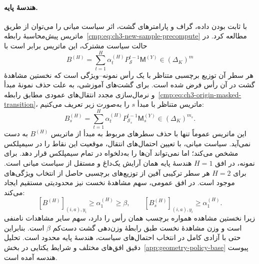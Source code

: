 \paragraph{هندسهٔ پایه.}
با ثابت بودن داده، گراف و پارامترهای گشت، اثر سیاست میانی را می‌توان از طریق ماتریس پیش‌محاسبهٔ رابطه~\eqref{cmp:eq:ch3-new-sample-precompute} مطالعه کرد. در حالت سیاست مشترک، این ماتریس برابر است با
\begin{equation}\label{cmp:eq:ch3-geometry-base-B}
B^{(H)}=\sum_{t=1}^{H}\alpha_t^{(H)}P_{\mathcal S}^{t-1}\mathsf M^{(Y)}\in(\Delta_K)^m
\end{equation}
هر سطر آن توزیع برچسبی متناظر با یک رأس نمونه--ویژگی است که نخستین مشاهدهٔ گشت در آن رأس فرض شده است. برای گشت‌های آموزشی، به علت حذف نمونهٔ مبدأ و نرمال‌سازی مجدد انتقال‌های عمودی مطابق رابطه~\eqref{cmp:eq:ch3-origin-masked-transition}، ماتریس متناظر با مبدأ $s$ را به‌صورت زیر تعریف می‌کنیم:
\begin{equation}\label{cmp:eq:ch3-geometry-origin-B}
B_s^{(H)}=\sum_{t=1}^{H}\alpha_t^{(H)}P_{\mathcal S_s}^{t-1}\mathsf M_s^{(Y)}\in(\Delta_K)^{m_s}.
\end{equation}
این ماتریس عموماً تنها با حذف سطرهای مربوط به مبدأ از ماتریس $B^{(H)}$ به دست نمی‌آید. سیاست میانی، با تعیین احتمال‌های انتقال، موقعیت این نقاط را در سیمپلکس مشخص می‌کند؛ اما نمی‌تواند آن‌ها را به‌دلخواه در تمام سیمپلکس قرار دهد. برای نمونه، در افق $H=1$ هندسهٔ پایه همان آرایش یک‌داغ و مستقل از سیاست میانی است. برای $H=2$ هر سطر ترکیبی آفین از توزیع‌های برچسبی حاصل از انتخاب ویژگی‌های موجود است. در افق عمومی، سهم مشاهدهٔ نخست نیز محدودیتی مستقیم ایجاد می‌کند:
\begin{equation}\label{cmp:eq:ch3-geometry-base-own-label-bound}
[B^{(H)}]_{(i,a),y_i}\ge\alpha_1^{(H)}\ge\beta,
\qquad
[B_s^{(H)}]_{(i,a),y_i}\ge\alpha_1^{(H)}.
\end{equation}
زیرا نخستین مشاهده همواره برچسب همان رأس را دارد، سهم سایر مشاهدات نامنفی است و وزن مشاهدهٔ نخست طبق رابطهٔ وزن‌دهی گشت دست‌کم $\beta$ است. بنابراین حتی با آزادی کامل در انتخاب احتمال‌های سیاست، هندسهٔ پایه محدود است. تحلیل دقیق افق‌های مختلف و شرایط یکتایی در بخش~\ref{app:geometry-policy-base} پیوست هندسه آمده است.

